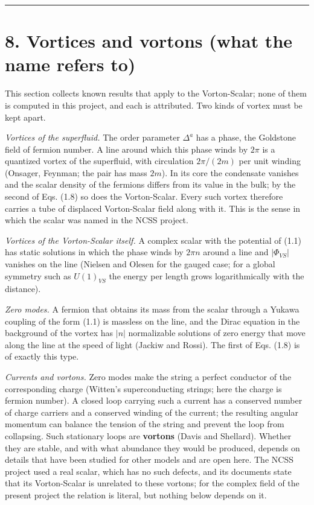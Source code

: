 \documentclass[
  10pt,
]{article}
\begin{document}
\begin{center}\rule{0.5\linewidth}{0.5pt}\end{center}

\hypertarget{vortices-and-vortons-what-the-name-refers-to}{%
\section{8. Vortices and vortons (what the name refers
to)}\label{vortices-and-vortons-what-the-name-refers-to}}

This section collects known results that apply to the Vorton-Scalar;
none of them is computed in this project, and each is attributed. Two
kinds of vortex must be kept apart.

\emph{Vortices of the superfluid.} The order parameter \(\Delta^a\) has
a phase, the Goldstone field of fermion number. A line around which this
phase winds by \(2\pi\) is a quantized vortex of the superfluid, with
circulation \(2\pi/(2m)\) per unit winding (Onsager, Feynman; the pair
has mass \(2m\)). In its core the condensate vanishes and the scalar
density of the fermions differs from its value in the bulk; by the
second of Eqs. (1.8) so does the Vorton-Scalar. Every such vortex
therefore carries a tube of displaced Vorton-Scalar field along with it.
This is the sense in which the scalar was named in the NCSS project.

\emph{Vortices of the Vorton-Scalar itself.} A complex scalar with the
potential of (1.1) has static solutions in which the phase winds by
\(2\pi n\) around a line and \(|\Phi_{VS}|\) vanishes on the line
(Nielsen and Olesen for the gauged case; for a global symmetry such as
\(U(1)_{VS}\) the energy per length grows logarithmically with the
distance).

\emph{Zero modes.} A fermion that obtains its mass from the scalar
through a Yukawa coupling of the form (1.1) is massless on the line, and
the Dirac equation in the background of the vortex has \(|n|\)
normalizable solutions of zero energy that move along the line at the
speed of light (Jackiw and Rossi). The first of Eqs. (1.8) is of exactly
this type.

\emph{Currents and vortons.} Zero modes make the string a perfect
conductor of the corresponding charge (Witten's superconducting strings;
here the charge is fermion number). A closed loop carrying such a
current has a conserved number of charge carriers and a conserved
winding of the current; the resulting angular momentum can balance the
tension of the string and prevent the loop from collapsing. Such
stationary loops are \textbf{vortons} (Davis and Shellard). Whether they
are stable, and with what abundance they would be produced, depends on
details that have been studied for other models and are open here. The
NCSS project used a real scalar, which has no such defects, and its
documents state that its Vorton-Scalar is unrelated to these vortons;
for the complex field of the present project the relation is literal,
but nothing below depends on it.
\end{document}
